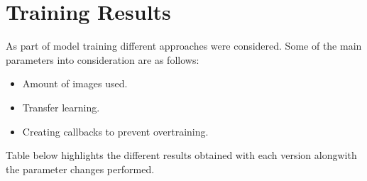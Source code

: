 \section{Training Results}
\label{section:results}
As part of model training different approaches were considered. Some of the main parameters into consideration are as follows:
\begin{itemize}
    \item Amount of images used.
    \item Transfer learning.
    \item Creating callbacks to prevent overtraining.
\end{itemize}
Table below highlights the different results obtained with each version alongwith the parameter changes performed.\\
